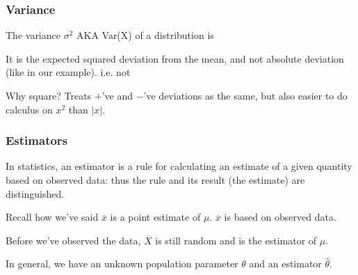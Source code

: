 \documentclass[slides]{beamer}
\newcommand{\blue}[1]{\textcolor{blue2}{#1}}
\newcommand{\xbar}{\overline{x}}
\newcommand{\E}{\mathbb{E}}
\begin{document}
\begin{frame}
\frametitle{Variance}
The variance $\sigma^2$ AKA Var(X) of a distribution is

\vspace{2cm}

\pause
\vspace{0.5cm}

It is the expected \blue{squared} deviation from the mean, and not \blue{absolute} deviation (like in our example).  i.e. not

\pause
\vspace{2.5cm}
Why square?  Treats $+$'ve and $-$'ve deviations as the same, but also easier to do calculus on $x^2$ than $|x|$.

\end{frame}



\begin{frame}
\frametitle{Estimators}
In statistics, an \blue{estimator} is a rule for calculating an estimate of a given quantity based on observed data: thus the rule and its result (the estimate) are distinguished.

\pause
\vspace{0.25cm}

Recall how we've said $\xbar$ is a point estimate of $\mu$.   $\xbar$ is based on \blue{observed data}.

\pause
\vspace{0.25cm}

Before we've observed the data, $\overline{X}$ is still random and is the estimator of $\mu$.

\pause
\vspace{0.25cm}

In general, we have an unknown population parameter $\theta$ and an estimator $\widehat{\theta}$.  

\end{frame}
\end{document}
